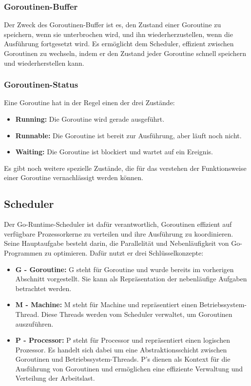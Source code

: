 \documentclass[fontsize=12pt,paper=a4,twoside=semi,parskip=half-,headsepline,headinclude]{scrreprt}
\begin{document}
\subsubsection{Goroutinen-Buffer}
Der Zweck des Goroutinen-Buffer ist es, den Zustand einer Goroutine zu speichern, wenn sie unterbrochen wird, und ihn wiederherzustellen, wenn die Ausführung fortgesetzt wird. Es ermöglicht dem Scheduler, effizient zwischen Goroutinen zu wechseln, indem er den Zustand jeder Goroutine schnell speichern und wiederherstellen kann.
 
\subsubsection{Goroutinen-Status}

Eine Goroutine hat in der Regel einen der drei Zustände:

\begin{itemize}
	\item \textbf{Running:} Die Goroutine wird gerade ausgeführt.
	\item \textbf{Runnable:} Die Goroutine ist bereit zur Ausführung, aber läuft noch nicht.
	\item \textbf{Waiting:} Die Goroutine ist blockiert und wartet auf ein Ereignis.
\end{itemize}	

Es gibt noch weitere spezielle Zustände, die für das verstehen der Funktionsweise einer Goroutine vernachlässigt werden können.
	
\subsection{Scheduler}
\label{subsec:scheduler}

Der Go-Runtime-Scheduler \cite{goScheduler2024} ist dafür verantwortlich, Goroutinen effizient auf verfügbare Prozessorkerne zu verteilen und ihre Ausführung zu koordinieren. Seine Hauptaufgabe besteht darin, die Parallelität und Nebenläufigkeit von Go-Programmen zu optimieren. Dafür nutzt er drei Schlüsselkonzepte:

\begin{itemize}
	\item \textbf{G - Goroutine:} G steht für Goroutine und wurde bereits im vorherigen Abschnitt vorgestellt. Sie kann als Repräsentation der nebenläufige Aufgaben betrachtet werden.
	\item \textbf{M - Machine:} M steht für Machine und repräsentiert einen Betriebssystem-Thread. Diese Threads werden vom Scheduler verwaltet, um Goroutinen auszuführen.
	\item \textbf{P - Processor:} P steht für Processor und repräsentiert einen logischen Prozessor. Es handelt sich dabei um eine Abstraktionsschicht zwischen Goroutinen und Betriebssystem-Threads. P's dienen als Kontext für die Ausführung von Goroutinen und ermöglichen eine effiziente Verwaltung und Verteilung der Arbeitslast.
\end{itemize}	
\end{document}

